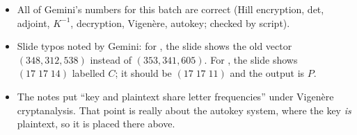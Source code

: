 \begin{fixbox}
\begin{itemize}
  \item All of Gemini's numbers for this batch are correct (Hill encryption, det, adjoint, $K^{-1}$, decryption, Vigen\`ere, autokey; checked by script).
  \item Slide typos noted by Gemini: for , the slide shows the old vector $(348, 312, 538)$ instead of $(353, 341, 605)$. For , the slide shows $(17\;17\;14)$ labelled $C$; it should be $(17\;17\;11)$ and the output is $P$.
  \item The notes put ``key and plaintext share letter frequencies'' under Vigen\`ere cryptanalysis. That point is really about the autokey system, where the key \emph{is} plaintext, so it is placed there above.
\end{itemize}
\end{fixbox}

